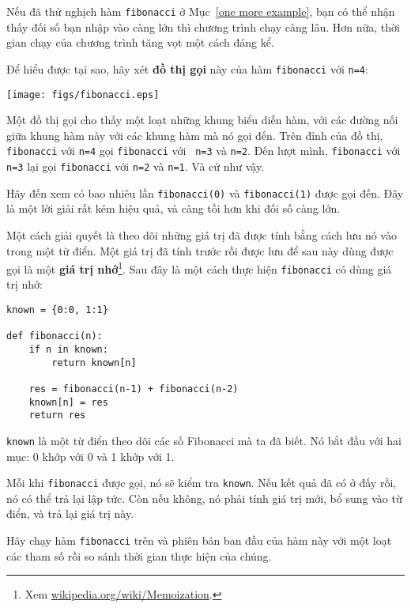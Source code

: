 \documentclass[11pt]{book}
\begin{document}
Nếu đã thử nghịch hàm {\tt fibonacci} ở 
Mục~\ref{one more example}, bạn có thể nhận thấy đối số bạn nhập vào
càng lớn thì chương trình chạy càng lâu.
Hơn nữa, thời gian chạy của chương trình tăng vọt một cách đáng kể.


Để hiểu được tại sao, hãy xét {\bf đồ thị gọi} này của hàm
{\tt fibonacci} với {\tt n=4}:

\beforefig
\centerline{\texttt{[image: figs/fibonacci.eps]}}
\afterfig

Một đồ thị gọi cho thấy một loạt những khung biểu diễn hàm, với các đường
nối giữa khung hàm này với các khung hàm mà nó gọi đến. Trên đỉnh của đồ thị,
{\tt fibonacci} với {\tt n=4} gọi {\tt fibonacci} với {\tt
n=3} và {\tt n=2}.  Đến lượt mình, {\tt fibonacci} với {\tt n=3} lại gọi
{\tt fibonacci} với {\tt n=2} và {\tt n=1}.  Và cứ như vậy.


Hãy đến xem có bao nhiêu lần {\tt fibonacci(0)} và {\tt fibonacci(1)} được
gọi đến. Đây là một lời giải rất kém hiệu quả, và càng tồi hơn khi đối số
càng lớn.


Một cách giải quyết là theo dõi những giá trị đã được tính bằng cách 
lưu nó vào trong một từ điển. Một giá trị đã tính trước rồi được lưu để
sau này dùng được gọi là một {\bf giá trị nhớ}\footnote{Xem
  \url{wikipedia.org/wiki/Memoization}.}.  Sau đây là một
cách thực hiện {\tt fibonacci} có dùng giá trị nhớ:

\beforeverb
\begin{verbatim}
known = {0:0, 1:1}

def fibonacci(n):
    if n in known:
        return known[n]

    res = fibonacci(n-1) + fibonacci(n-2)
    known[n] = res
    return res
\end{verbatim}
\afterverb
%
{\tt known} là một từ điển theo dõi các số Fibonacci mà ta đã biết.
Nó bắt đầu với hai mục: 0 khớp với 0 và 1 khớp với 1.

Mỗi khi {\tt fibonacci} được gọi, nó sẽ kiểm tra {\tt known}.
Nếu kết quả đã có ở đấy rồi, nó có thể trả lại lập tức. Còn nếu không,
nó phải tính giá trị mới, bổ sung vào từ điển, và trả lại giá trị này.


\begin{ex}
Hãy chạy hàm {\tt fibonacci} trên và phiên bản ban đầu của hàm này
với một loạt các tham số rồi so sánh thời gian thực hiện của chúng.
\end{ex}
\end{document}
